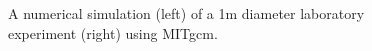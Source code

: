 \begin{figure}
\caption{A numerical simulation (left) of a 1m diameter laboratory
experiment (right) using MITgcm.}
\label{fig:lab-simulation}
\end{figure}
